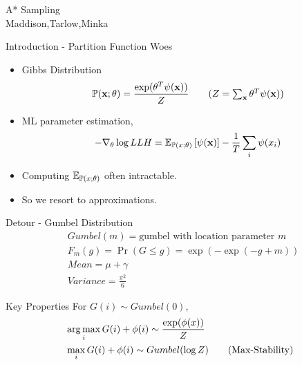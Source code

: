 \begin{frame}
  \begin{center}
    {\huge A* Sampling
    } \\
    Maddison,Tarlow,Minka
  \end{center}
\end{frame}

\begin{frame}{Introduction - Partition Function Woes}
  \begin{itemize}
  \item Gibbs Distribution
    \begin{align*}
      \Pr(\x;\theta) =\frac{\exp(\theta^T\psi(\x))}{Z} \tag{$Z=\sum_{\x} \theta^T\psi(\x)$}
    \end{align*}
  \item ML parameter estimation,
    \begin{align*}
      - \nabla_\theta \log LLH = \operatorname{\mathbb{E}}_{\mathbb{P}(x;\theta)}\left[\psi(\operatorname{\mathbf{x}})\right] - \frac{1}{T} \sum_i\psi(x_i)
    \end{align*}
  \item   Computing $\operatorname{\mathbb{E}}_{\mathbb{P}(x;\theta)}$ often intractable.
  \item So we resort to approximations. %
  \end{itemize}
\end{frame}

\begin{frame}{Detour - Gumbel Distribution}
  \begin{align*}
    & Gumbel(m) = \text{gumbel with location parameter $m$}\\
    & F_m(g) = \Pr(G\le g) = \exp(-\exp(-g+m)) \tag{CDF for $Gumbel(m)$}\\
    & Mean = \mu+\gamma \tag{a fixed offset away from location parameter} \\
    & Variance = \frac{\pi^2}{6}
  \end{align*}
\end{frame}

\begin{frame}{Key Properties}
  For $G(i) \sim Gumbel(0)$,
  \begin{align*}
    & \operatorname*{{arg\,max}}_i{G(i)+\phi(i)} \sim \frac{\exp(\phi(x))}{Z} \\
    & \max_i{G(i)+\phi(i)} \sim Gumbel(\log Z) \tag{Max-Stability}
  \end{align*}
\end{frame}

